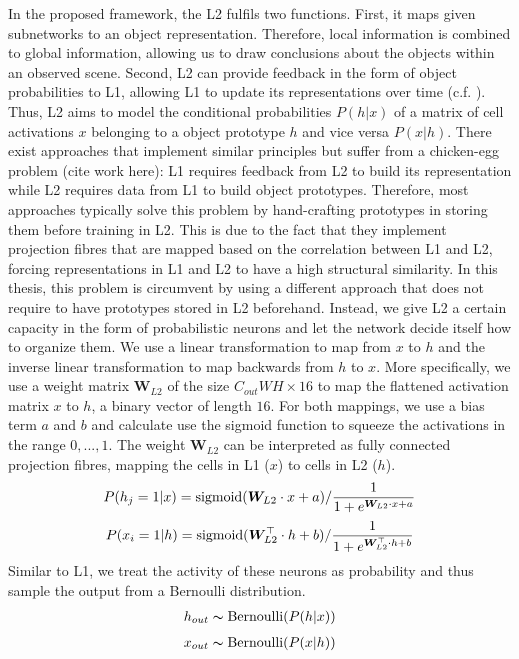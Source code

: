 In the proposed framework, the L2 fulfils two functions. First, it maps given subnetworks to an object representation. Therefore, local information is combined to global information, allowing us to draw conclusions about the objects within an observed scene. Second, L2 can provide feedback in the form of object probabilities to L1, allowing L1 to update its representations over time (c.f. ).
Thus, L2 aims to model the conditional probabilities $P(h|x)$ of a matrix of cell activations $x$ belonging to a object prototype $h$ and vice versa $P(x|h)$.
There exist approaches that implement similar principles but suffer from a chicken-egg problem (cite work here): L1 requires feedback from L2 to build its representation while L2 requires data from L1 to build object prototypes. Therefore, most approaches typically solve this problem by hand-crafting prototypes in storing them before training in L2. This is due to the fact that they implement projection fibres that are mapped based on the correlation between L1 and L2, forcing representations in L1 and L2 to have a high structural similarity.
In this thesis, this problem is circumvent by using a different approach that does not require to have prototypes stored in L2 beforehand. Instead, we give L2 a certain capacity in the form of probabilistic neurons and let the network decide itself how to organize them. 
We use a linear transformation to map from $x$ to $h$ and the inverse linear transformation to map backwards from $h$ to $x$.
More specifically, we use a weight matrix $\boldsymbol{W}_{L2}$ of the size $C_{out}WH \times 16$ to map the flattened activation matrix $x$ to $h$, a binary vector of length $16$. For both mappings, we use a bias term $a$ and $b$ and calculate use the sigmoid function to squeeze the activations in the range $0, ..., 1$. 
The weight $\boldsymbol{W}_{L2}$ can be interpreted as fully connected projection fibres, mapping the cells in L1 ($x$) to cells in L2 ($h$).
\begin{align}\eqlbl{l2_1}
	P(h_j=1 | x) = \text{sigmoid}(\boldsymbol{W}_{L2} \cdot x + a) / \frac{1}{1 + e^{\boldsymbol{W}_{L2} \cdot x + a}}
\end{align}
\begin{align}\eqlbl{l2_2}
	P(x_i=1 | h) = \text{sigmoid}(\boldsymbol{W}_{L2}^\top \cdot h + b) / \frac{1}{1 + e^{\boldsymbol{W}_{L2}^\top \cdot h + b}}
\end{align}
Similar to L1, we treat the activity of these neurons as probability and thus sample the output from a Bernoulli distribution.
\begin{align}\eqlbl{l2_3}
	h_{out} \thicksim \text{Bernoulli}(P(h | x) )
\end{align}
\begin{align}\eqlbl{l2_4}
	x_{out} \thicksim \text{Bernoulli}(P(x | h))
\end{align}

